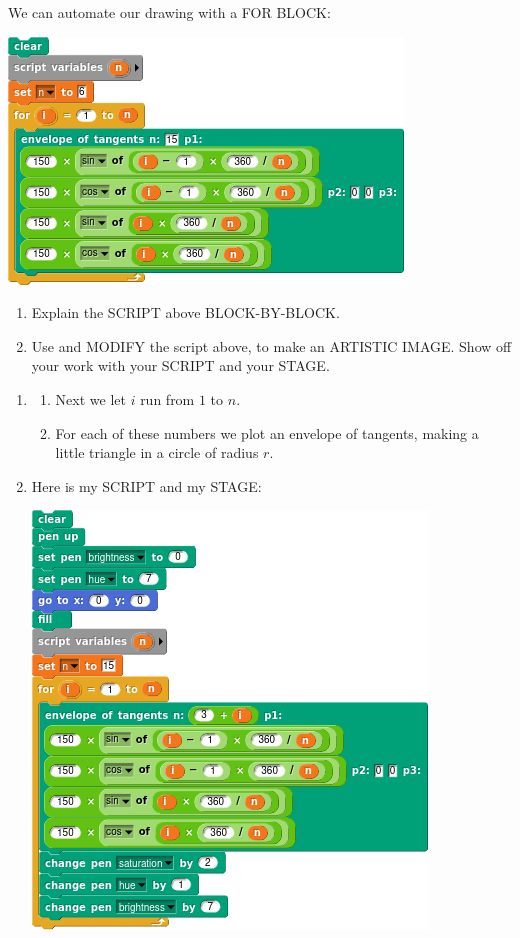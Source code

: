 \documentclass[noauthor,nooutcomes,12pt,hints]{ximera}
\begin{document}
\begin{question}
  We can automate our drawing with a FOR BLOCK:
  \begin{center}
    \includegraphics{forEnvTan.png}
  \end{center}
  \begin{enumerate}
  \item Explain the SCRIPT above BLOCK-BY-BLOCK.
  \item Use and MODIFY the script above, to make an ARTISTIC
    IMAGE. Show off your work with your SCRIPT and your STAGE.
  \end{enumerate}
  \begin{freeResponse}
    \begin{enumerate}
    \item \begin{enumerate} We start by making a variable called $n$,
      and we set it to $6$.
    \item Next we let $i$ run from $1$ to $n$.
    \item For each of these numbers we plot an envelope of tangents,
      making a little triangle in a circle of radius $r$.
    \end{enumerate}
    \item Here is my SCRIPT and my STAGE:
      \begin{center}
    \includegraphics[width=.3\textwidth]{lineArtisticScript.png}\qquad{}
  \end{center}
    \end{enumerate}
  \end{freeResponse}
\end{question}
\end{document}
